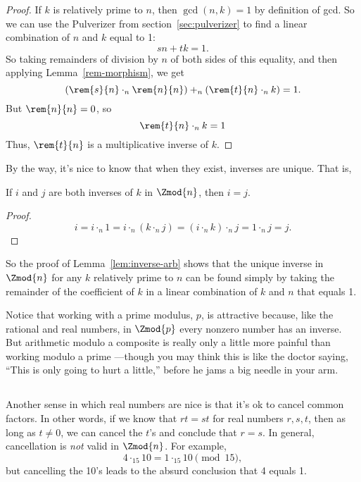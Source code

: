 \begin{proof}
If $k$ is relatively prime to $n$, then $\gcd(n, k) = 1$ by definition
of gcd.  So we can use the Pulverizer from section~\ref{sec:pulverizer} to find
a linear combination of $n$ and $k$ equal to 1:
\[
s n + t k = 1.
\]
So taking remainders of division by $n$ of both sides of this
equality, and then applying Lemma~\ref{rem-morphism}, we get
\[
(\rem{s}{n} \cdot_n \rem{n}{n}) +_n (\rem{t}{n} \cdot_n k) = 1.
\]
But $\rem{n}{n} = 0$, so
\[
\rem{t}{n} \cdot_n k = 1
\]
Thus, $\rem{t}{n}$ is a multiplicative inverse of $k$.
\end{proof}

By the way, it's nice to know that when they exist, inverses are
unique.  That is,
\begin{lemma}\label{uniq-inv}
If $i$ and $j$ are both inverses of $k$ in $\Zmod{n}$, then $i=j$.
\end{lemma}

\begin{proof}
\[
i = i \cdot_n 1 = i \cdot_n (k \cdot_n j) = (i \cdot_n k) \cdot_n j = 1 \cdot_n j = j.
\]
\end{proof}

So the proof of Lemma~\ref{lem:inverse-arb} shows that the unique
inverse in $\Zmod{n}$ for any $k$ relatively prime to $n$ can be found
simply by taking the remainder of the coefficient of $k$ in a linear
combination of $k$ and $n$ that equals 1.

Notice that working with a prime modulus, $p$, is attractive because,
like the rational and real numbers, in $\Zmod{p}$ every nonzero number
has an inverse.  But arithmetic modulo a composite is really only a
little more painful than working modulo a prime ---though you may
think this is like the doctor saying, ``This is only going to hurt a
little,'' before he jams a big needle in your arm.

\subsection{}

Another sense in which real numbers are nice is that it's ok to cancel
common factors.  In other words, if we know that $r t = s t$ for real
numbers $r,s,t$, then as long as $t \neq 0$, we can cancel the $t$'s
and conclude that $r = s$.  In general, cancellation is \emph{not}
valid in $\Zmod{n}$.  For example,
\[
4 \cdot_{15} 10 = 1 \cdot_{15} 10 \pmod{15},
\]
but cancelling the 10's leads to the absurd conclusion that 4 equals 1.

